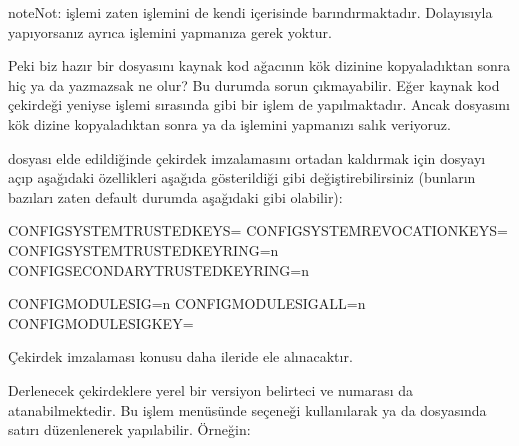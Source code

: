 \documentclass[a4paper,10pt,turkish]{sphinxmanual}
\begin{document}
\begin{sphinxadmonition}{note}{Not:}
\sphinxAtStartPar
{} işlemi zaten  işlemini de kendi içerisinde
barındırmaktadır. Dolayısıyla  yapıyorsanız ayrıca 
işlemini yapmanıza gerek yoktur.
\end{sphinxadmonition}

\sphinxAtStartPar
Peki biz hazır bir  dosyasını kaynak kod ağacının kök dizinine kopyaladıktan sonra hiç
 ya da  yazmazsak ne olur? Bu durumda sorun çıkmayabilir. Eğer
kaynak kod çekirdeği yeniyse  işlemi sırasında  gibi bir işlem de
yapılmaktadır. Ancak  dosyasını kök dizine kopyaladıktan sonra  ya da
 işlemini yapmanızı salık veriyoruz.

\sphinxAtStartPar
{} dosyası elde edildiğinde çekirdek imzalamasını ortadan kaldırmak için dosyayı açıp
aşağıdaki özellikleri aşağıda gösterildiği gibi değiştirebilirsiniz (bunların bazıları zaten default
durumda aşağıdaki gibi olabilir):

\begin{sphinxVerbatim}[commandchars=\\\{\}]
CONFIG\PYGZus{}SYSTEM\PYGZus{}TRUSTED\PYGZus{}KEYS=\PYGZdq{}\PYGZdq{}
CONFIG\PYGZus{}SYSTEM\PYGZus{}REVOCATION\PYGZus{}KEYS=\PYGZdq{}\PYGZdq{}
CONFIG\PYGZus{}SYSTEM\PYGZus{}TRUSTED\PYGZus{}KEYRING=n
CONFIG\PYGZus{}SECONDARY\PYGZus{}TRUSTED\PYGZus{}KEYRING=n

CONFIG\PYGZus{}MODULE\PYGZus{}SIG=n
CONFIG\PYGZus{}MODULE\PYGZus{}SIG\PYGZus{}ALL=n
CONFIG\PYGZus{}MODULE\PYGZus{}SIG\PYGZus{}KEY=\PYGZdq{}\PYGZdq{}
\end{sphinxVerbatim}

\sphinxAtStartPar
Çekirdek imzalaması konusu daha ileride ele alınacaktır.

\sphinxAtStartPar
Derlenecek çekirdeklere yerel bir versiyon belirteci ve numarası da atanabilmektedir. Bu işlem
 menüsünde  seçeneği
kullanılarak ya da  dosyasında  satırı düzenlenerek yapılabilir.
Örneğin:
\end{document}
